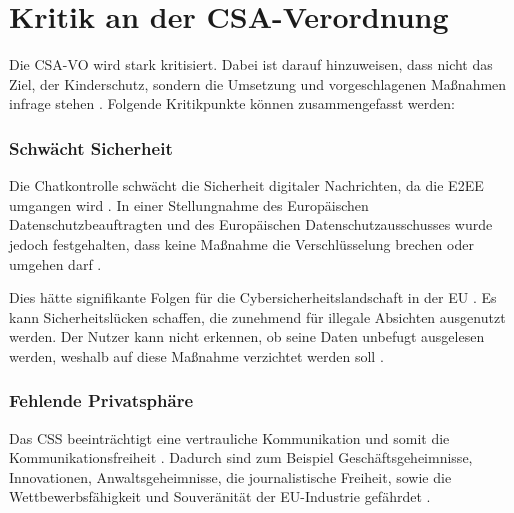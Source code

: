 \chapter{Kritik an der CSA-Verordnung}          %
\label{sec:CSA:Kritik}

Die \ac{CSA-VO} wird stark kritisiert. Dabei ist darauf hinzuweisen, dass nicht das Ziel, der Kinderschutz, sondern die Umsetzung und vorgeschlagenen Maßnahmen infrage stehen \cite{DSK:2023:Brief}. Folgende Kritikpunkte können zusammengefasst werden:


\subsection*{Schwächt Sicherheit}
\label{subsec:CSA:Kritik:schwaechtSicherheit}
Die Chatkontrolle schwächt die Sicherheit digitaler Nachrichten, da die \ac{E2EE} umgangen wird \cite{DSK:2023:Brief, edri:2023, np:meineck:2022}. In einer Stellungnahme des Europäischen Datenschutzbeauftragten und des Europäischen Datenschutzausschusses wurde jedoch festgehalten, dass keine Maßnahme die Verschlüsselung brechen oder umgehen darf \cite{np:meineck:2022}.

Dies hätte signifikante \glqq Folgen für die Cybersicherheitslandschaft in der \acs{EU}\grqq{} \cite{ blacknightsolutions:2024}. Es kann Sicherheitslücken schaffen, die zunehmend für illegale Absichten ausgenutzt werden. Der Nutzer kann nicht erkennen, ob seine Daten unbefugt ausgelesen werden, weshalb auf diese Maßnahme verzichtet werden soll \cite{DSK:2023:Brief, edri:2023, portnoy:2019}.


\subsection*{Fehlende Privatsphäre}
\label{subsec:CSA:Kritik:fehlendePrivatsphäre}

Das \ac{CSS} beeinträchtigt eine vertrauliche Kommunikation und somit die Kommunikationsfreiheit \cite{DSK:2023:Brief, edri:2023}. Dadurch sind zum Beispiel Geschäftsgeheimnisse, Innovationen, Anwaltsgeheimnisse, die journalistische Freiheit, sowie die Wettbewerbsfähigkeit und Souveränität der \ac{EU}-Industrie gefährdet \cite{edri:2023}.

